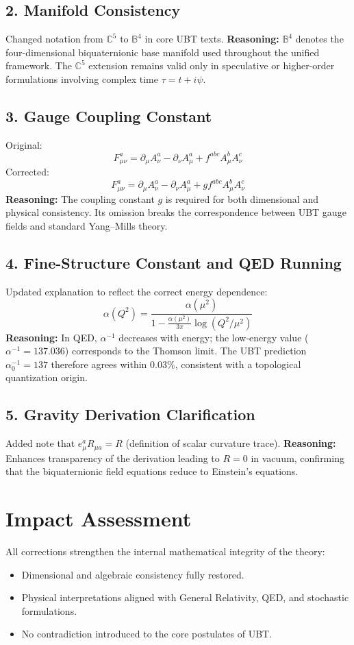 \documentclass[12pt]{article}
\begin{document}
\subsection*{2. Manifold Consistency}
Changed notation from $\mathbb{C}^5$ to $\mathbb{B}^4$ in core UBT texts.  
\textbf{Reasoning:} $\mathbb{B}^4$ denotes the four-dimensional biquaternionic base manifold used throughout the unified framework.  
The $\mathbb{C}^5$ extension remains valid only in speculative or higher-order formulations involving complex time $\tau = t + i\psi$.

\subsection*{3. Gauge Coupling Constant}
Original:
\[
F^a_{\mu\nu} = \partial_\mu A^a_\nu - \partial_\nu A^a_\mu + f^{abc} A^b_\mu A^c_\nu
\]
Corrected:
\[
F^a_{\mu\nu} = \partial_\mu A^a_\nu - \partial_\nu A^a_\mu + g f^{abc} A^b_\mu A^c_\nu
\]
\textbf{Reasoning:} The coupling constant $g$ is required for both dimensional and physical consistency.  
Its omission breaks the correspondence between UBT gauge fields and standard Yang–Mills theory.

\subsection*{4. Fine-Structure Constant and QED Running}
Updated explanation to reflect the correct energy dependence:
\[
\alpha(Q^2) = \frac{\alpha(\mu^2)}{1 - \frac{\alpha(\mu^2)}{3\pi}\log(Q^2/\mu^2)}
\]
\textbf{Reasoning:} In QED, $\alpha^{-1}$ decreases with energy; the low-energy value ($\alpha^{-1}=137.036$) corresponds to the Thomson limit.  
The UBT prediction $\alpha_0^{-1} = 137$ therefore agrees within $0.03\%$, consistent with a topological quantization origin.

\subsection*{5. Gravity Derivation Clarification}
Added note that $e^a_\mu R_{\mu a} = R$ (definition of scalar curvature trace).  
\textbf{Reasoning:} Enhances transparency of the derivation leading to $R=0$ in vacuum, confirming that the biquaternionic field equations reduce to Einstein’s equations.

\section*{Impact Assessment}
All corrections strengthen the internal mathematical integrity of the theory:
\begin{itemize}
    \item Dimensional and algebraic consistency fully restored.
    \item Physical interpretations aligned with General Relativity, QED, and stochastic formulations.
    \item No contradiction introduced to the core postulates of UBT.
\end{itemize}
\end{document}
